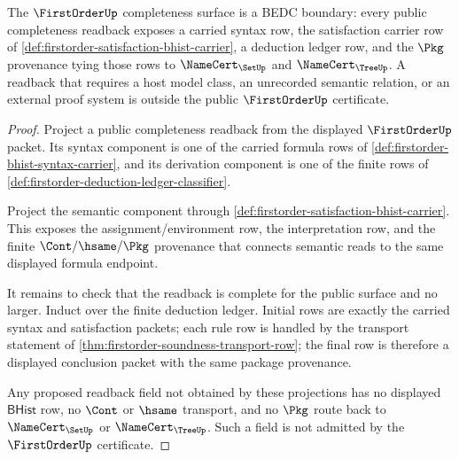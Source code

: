 \begin{theorem}\label{thm:firstorder-completeness-boundary}
The $\FirstOrderUp$ completeness surface is a BEDC boundary: every public
completeness readback exposes a carried syntax row, the satisfaction carrier
row of \autoref{def:firstorder-satisfaction-bhist-carrier}, a deduction ledger
row, and the $\Pkg$ provenance tying those rows to $\NameCert_{\SetUp}$ and
$\NameCert_{\TreeUp}$. A readback that requires a host model class, an
unrecorded semantic relation, or an external proof system is outside the
public $\FirstOrderUp$ certificate.
\end{theorem}
\begin{proof}
Project a public completeness readback from the displayed $\FirstOrderUp$
packet. Its syntax component is one of the carried formula rows of
\autoref{def:firstorder-bhist-syntax-carrier}, and its derivation component is
one of the finite rows of
\autoref{def:firstorder-deduction-ledger-classifier}.

Project the semantic component through
\autoref{def:firstorder-satisfaction-bhist-carrier}. This exposes the
assignment/environment row, the interpretation row, and the finite
$\Cont/\hsame/\Pkg$ provenance that connects semantic reads to the same
displayed formula endpoint.

It remains to check that the readback is complete for the public surface and
no larger. Induct over the finite deduction ledger. Initial rows are exactly
the carried syntax and satisfaction packets; each rule row is handled by the
transport statement of
\autoref{thm:firstorder-soundness-transport-row}; the final row is therefore a
displayed conclusion packet with the same package provenance.

Any proposed readback field not obtained by these projections has no displayed
$\mathsf{BHist}$ row, no $\Cont$ or $\hsame$ transport, and no $\Pkg$ route back
to $\NameCert_{\SetUp}$ or $\NameCert_{\TreeUp}$. Such a field is not admitted
by the $\FirstOrderUp$ certificate.
\end{proof}

